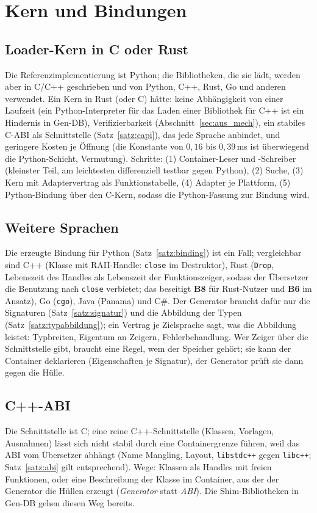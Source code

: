 \documentclass[a4paper,12pt,twoside]{report}
\DeclareRobustCommand{\_}{\ifmmode\mbox{\textunderscore}\else\textunderscore\allowbreak{}\fi}
\theoremstyle{definition}
\newcommand{\Bf}[1]{\textbf{B#1}}
\begin{document}
\section{Kern und Bindungen}
\label{sec:aus_kern}

\subsection{Loader-Kern in C oder Rust}
Die Referenzimplementierung ist Python; die Bibliotheken, die sie lädt, werden aber in C/C++ geschrieben und von Python, C++, Rust, Go und anderen verwendet. Ein Kern in Rust (oder C) hätte: keine Abhängigkeit von einer Laufzeit (ein Python-Interpreter für das Laden einer Bibliothek für C++ ist ein Hindernis in Gen-DB), Verifizierbarkeit (Abschnitt~\ref{sec:aus_mech}), ein stabiles C-ABI als Schnittstelle (Satz~\ref{satz:capi}), das jede Sprache anbindet, und geringere Kosten je Öffnung (die Konstante von $0{,}16$ bis $0{,}39$\,ms ist überwiegend die Python-Schicht, Vermutung). Schritte: (1) Container-Leser und -Schreiber (kleinster Teil, am leichtesten differenziell testbar gegen Python), (2) Suche, (3) Kern mit Adaptervertrag als Funktionstabelle, (4) Adapter je Plattform, (5) Python-Bindung über den C-Kern, sodass die Python-Fassung zur Bindung wird.

\subsection{Weitere Sprachen}
\label{sec:aus_sprachen}
Die erzeugte Bindung für Python (Satz~\ref{satz:binding}) ist ein Fall; vergleichbar sind C++ (Klasse mit RAII-Handle: \texttt{close} im Destruktor), Rust (\texttt{Drop}, Lebenszeit des Handles als Lebenszeit der Funktionszeiger, sodass der Übersetzer die Benutzung nach \texttt{close} verbietet; das beseitigt \Bf{8} für Rust-Nutzer und \Bf{6} im Ansatz), Go (\texttt{cgo}), Java (Panama) und C\#. Der Generator braucht dafür nur die Signaturen (Satz~\ref{satz:signatur}) und die Abbildung der Typen (Satz~\ref{satz:typabbildung}); ein Vertrag je Zielsprache sagt, was die Abbildung leistet: Typbreiten, Eigentum an Zeigern, Fehlerbehandlung. Wer Zeiger über die Schnittstelle gibt, braucht eine Regel, wem der Speicher gehört; sie kann der Container deklarieren (Eigenschaften je Signatur), der Generator prüft sie dann gegen die Hülle.

\subsection{C++-ABI}
Die Schnittstelle ist C; eine reine C++-Schnittstelle (Klassen, Vorlagen, Ausnahmen) lässt sich nicht stabil durch eine Containergrenze führen, weil das ABI vom Übersetzer abhängt (Name Mangling, Layout, \texttt{libstdc++} gegen \texttt{libc++}; Satz~\ref{satz:abi} gilt entsprechend). Wege: Klassen als Handles mit freien Funktionen, oder eine Beschreibung der Klasse im Container, aus der der Generator die Hüllen erzeugt (\emph{Generator} statt \emph{ABI}). Die Shim-Bibliotheken in Gen-DB gehen diesen Weg bereits.
\end{document}

